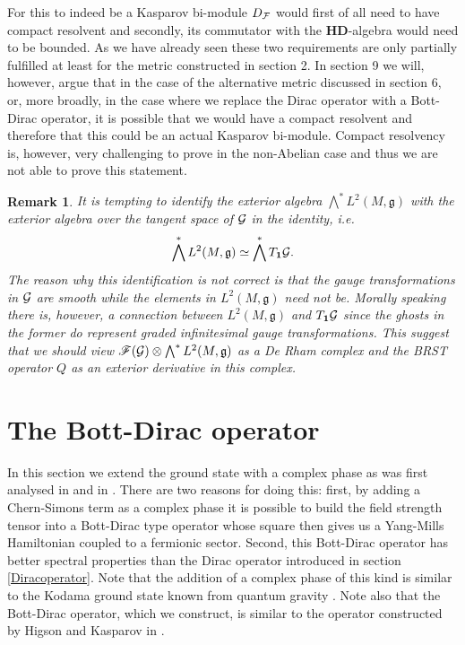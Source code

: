 \documentclass[letterpaper,11pt]{article}
\def\cf{{\cal F}}
\def\cg{{\cal G}}
\newtheorem{remark}{Remark}
\begin{document}
For this to indeed be a Kasparov bi-module  $D_\cf$ would first of all need to have compact resolvent and secondly, its commutator with the $\mathbf{HD}$-algebra would need to be bounded. As we have already seen these two requirements are only partially fulfilled at least for the metric constructed in section 2. In section 9 we will, however, argue that in the case of the alternative metric discussed in section 6, or, more broadly, in the case where we replace the Dirac operator with a Bott-Dirac operator, it is possible that we would have a compact resolvent and therefore that this could be an actual Kasparov bi-module. Compact resolvency is, however, very challenging to prove in the non-Abelian case and thus we are not able to prove this statement.









\begin{remark}
It is tempting to identify the exterior algebra $\bigwedge^* L^2(M,\mathfrak{g})$ with the exterior algebra over the tangent space of $\cg$ in the identity, i.e.
$$
\bigwedge^* L^2(M,\mathfrak{g}) \simeq \bigwedge^* T_\mathbf{1}\cg.
$$
The reason why this identification is not correct is that the gauge transformations in $\cg$ are smooth while the elements in $L^2(M,\mathfrak{g})$ need not be. Morally speaking there is, however, a connection between $L^2(M,\mathfrak{g})$ and $T_\mathbf{1}\cg$ since the ghosts in the former do represent graded infinitesimal gauge transformations. 
This suggest that we should view $\mathscr{F} (\cg)\otimes \bigwedge^* L^2(M,\mathfrak{g})$ as a De Rham complex and the BRST operator $Q$ as an exterior derivative in this complex.
\end{remark}



\section{The Bott-Dirac operator}

In this section we extend the ground state with a complex phase as was first analysed in \cite{Aastrup:2019yui} and in \cite{Aastrup:2020jcf}. There are two reasons for doing this: first, by adding a Chern-Simons term as a complex phase it is possible to build the field strength tensor into a Bott-Dirac type operator whose square then gives us a Yang-Mills Hamiltonian coupled to a fermionic sector. Second, this Bott-Dirac operator has better spectral properties than the Dirac operator introduced in section \ref{Diracoperator}. Note that the addition of a complex phase of this kind is similar to the Kodama ground state known from quantum gravity \cite{Kodama:1988yf,Smolin:2002sz}. Note also that the Bott-Dirac operator, which we construct, is similar to the operator constructed by Higson and Kasparov in \cite{Higson}. \\
\end{document}

